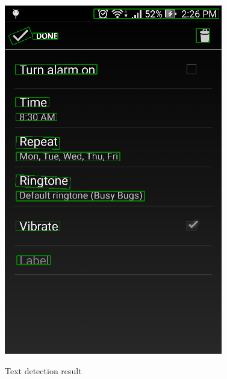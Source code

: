 \begin{figure}[H]
{	        \includegraphics[scale=0.5]{Chapters/Fig/text_detect_item.png}
	    }
	    \qquad
	    \qquad
	    \caption{Text detection result}
		\label{fig:text_detect}
	\end{figure}

